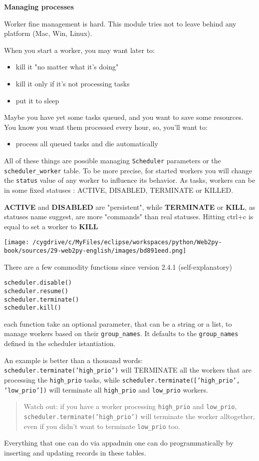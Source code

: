 \documentclass[justified,sixbynine,notoc]{tufte-book}
\def\ft{\small\tt}
\begin{document}
\begin{fullwidth}
{\bf Managing processes}

Worker fine management is hard. This module tries not to leave behind any platform (Mac, Win, Linux).

When you start a worker, you may want later to:
\begin{itemize}
\item kill it "no matter what it's doing"

\item kill it only if it's not processing tasks

\item put it to sleep
\end{itemize}
Maybe you have yet some tasks queued, and you want to save some resources.
You know you want them processed every hour, so, you'll want to:
\begin{itemize}
\item process all queued tasks and die automatically
\end{itemize}
All of these things are possible managing {\ft Scheduler} parameters or the {\ft scheduler\_worker} table.
To be more precise, for started workers you will change the {\ft status} value of any worker to influence
its behavior.
As tasks, workers can be in some fixed statuses : ACTIVE, DISABLED, TERMINATE or KILLED.

{\bf ACTIVE} and {\bf DISABLED} are "persistent", while {\bf TERMINATE} or {\bf KILL}, as statuses
name suggest, are more "commands" than real statuses.
Hitting ctrl+c is equal to set a worker to {\bf KILL}


\goodbreak\begin{center}\texttt{[image: /cygdrive/c/MyFiles/eclipse/workspaces/python/Web2py-book/sources/29-web2py-english/images/bd891eed.png]}\end{center}


There are a few commodity functions since version 2.4.1 (self-explanatory)
\begin{lstlisting}
scheduler.disable()
scheduler.resume()
scheduler.terminate()
scheduler.kill()
\end{lstlisting}
\noindent each function take an optional parameter, that can be a string or a list, to manage workers based on their {\ft group\_names}. It defaults to the {\ft group\_names} defined in the scheduler istantiation.

An example is better than a thousand words: {\ft scheduler.terminate('high\_prio')} will TERMINATE all the workers that are processing the {\ft high\_prio} tasks, while {\ft scheduler.terminate(['high\_prio', 'low\_prio'])} will terminate all {\ft high\_prio} and {\ft low\_prio} workers.
\begin{quote}Watch out: if you have a worker processing {\ft high\_prio} and {\ft low\_prio}, {\ft scheduler.terminate('high\_prio')} will terminate the worker alltogether, even if you didn't want to terminate {\ft low\_prio} too.\end{quote}
Everything that one can do via appadmin one can do programmatically by inserting and updating records in these tables.


\end{fullwidth}
\end{document}

